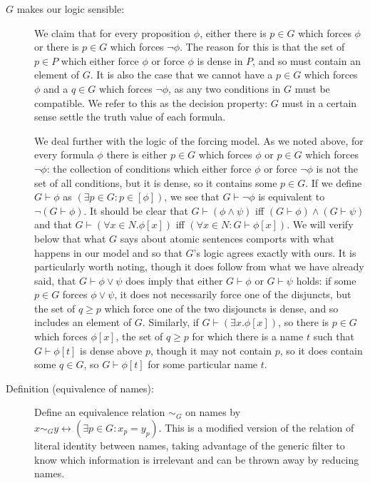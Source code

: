 \documentclass[12pt]{book}
\begin{document}
\begin{description}

\item[$G$ makes our logic sensible:]  We claim that for every proposition $\phi$, either there is $p \in G$ which forces $\phi$ or there is $p \in G$ which forces $\neg \phi$.  The reason for this is that the set of $p \in P$ which either force $\phi$ or force $\phi$ is dense in $P$, and so must contain an element of $G$.  It is also the case that we cannot have a $p \in G$ which forces $\phi$ and a $q \in G$ which forces $\neg \phi$, as any two conditions in $G$ must be compatible.  We refer to this as the decision property:  $G$ must in a certain sense settle the truth value of each formula.

We deal further with the logic of the forcing model.  As we noted above, for every formula $\phi$ there is either $p \in G$ which forces $\phi$ or $p \in G$ which forces $\neg \phi$:  the collection of conditions which either force $\phi$ or force $\neg \phi$ is not the set of all conditions, but it is dense, so it contains some $p \in G$.  If we define $G \vdash \phi$ as
$(\exists p \in G:p \in [\phi])$, we see that $G \vdash \neg \phi$ is equivalent to $\neg(G \vdash \phi)$.  It should be clear that $G \vdash (\phi \wedge \psi)$ iff $(G \vdash \phi) \wedge (G \vdash \psi)$ and that $G \vdash (\forall x \in N.\phi[x])$ iff $(\forall x \in N:G \vdash \phi[x])$.  We will verify below that what $G$ says about atomic sentences comports with what happens in our model and so that $G$'s logic agrees exactly with ours.  It is particularly worth noting, though it does follow from what we have already said, that $G \vdash \phi \vee \psi$ does imply that either $G \vdash \phi$ or $G \vdash \psi$ holds:  if some $p \in G$ forces $\phi \vee \psi$, it does not necessarily force one of the disjuncts, but the set of $q \geq p$ which force one of the two disjouncts is dense, and so includes an element of $G$.  Similarly, if $G \vdash (\exists x.\phi[x])$, so there is $p \in G$ which forces $\phi[x]$, the set of $q \geq p$ for which there is a name $t$ such that
$G \vdash \phi[t]$ is dense above $p$, though it may not contain $p$, so it does contain some $q \in G$, so $G \vdash \phi[t]$ for some particular name $t$.

\item[Definition (equivalence of names):]  Define an equivalence relation $\sim_G$ on names by $x \sim_G y \leftrightarrow (\exists p \in G:x_p = y_p)$.  This is a modified version of the relation of literal identity between names, taking advantage of the generic filter to know which information is irrelevant and can be thrown away by reducing names.


\end{description}
\end{document}
